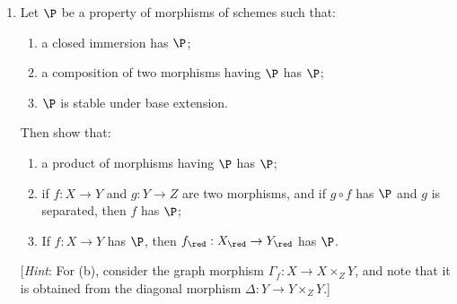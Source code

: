\documentclass[12pt]{amsart}
\begin{document}


\begin{enumerate}
  \item[4.8.] {
      Let $\P$ be a property of morphisms of schemes such that:
      \begin{enumerate}[label=(\roman*)]
        \item a closed immersion has $\P$;
        \item a composition of two morphisms having $\P$ has $\P$;
        \item $\P$ is stable under base extension.
      \end{enumerate}
      Then show that:
      \begin{enumerate}
        \item a product of morphisms having $\P$ has $\P$;
        \item if $f:X\to Y$ and $g:Y\to Z$ are two morphisms, and if $g\circ f$ has $\P$ and $g$ is separated, then $f$ has $\P$;
        \item If $f:X\to Y$ has $\P$, then $f_{\red}:X_\red\to Y_\red$ has $\P$.
      \end{enumerate}

      [\emph{Hint}: For (b), consider the graph morphism $\Gamma_f:X\to X\times_Z Y$, and note that it is obtained from the diagonal morphism $\Delta:Y\to Y\times_ZY$.]
    }
\end{enumerate}
\end{document}

